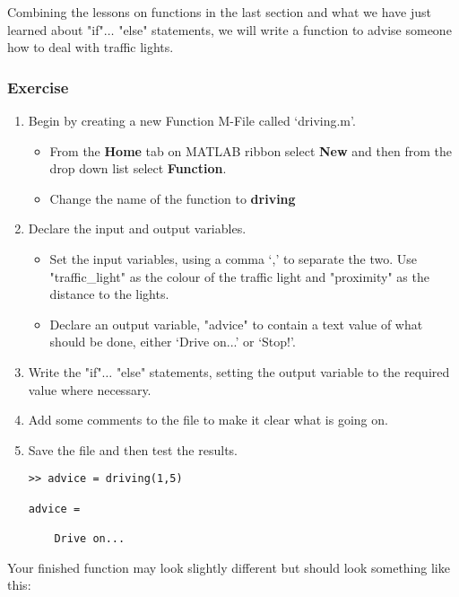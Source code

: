 \documentclass[12pt,a4paper]{article}
\begin{document}
Combining the lessons on functions in the last section and what we have just learned about "if"$\dots$ "else" statements, we will write a function to advise someone how to deal with traffic lights.

\subsubsection*{Exercise}
\begin{enumerate}
	\item Begin by creating a new Function M-File called `driving.m'.
	\begin{itemize}
		\item From the \textbf{Home} tab on MATLAB ribbon select \textbf{New} and then from the drop down list select \textbf{Function}.
		\item Change the name of the function to \textbf{driving}		
	\end{itemize}
	\item Declare the input and output variables.
	\begin{itemize}
		\item Set the input variables, using a comma `,' to separate the two.  Use "traffic_light" as the colour of the traffic light and "proximity" as the distance to the lights.
		\item Declare an output variable, "advice" to contain a text value of what should be done, either `Drive on...' or `Stop!'.			
	\end{itemize}
	\item Write the "if"$\dots$ "else" statements, setting the output variable to the required value where necessary.
	\item Add some comments to the file to make it clear what is going on.
	\item Save the file and then test the results.	
	\begin{lstlisting}[style=Matlab-editor]
>> advice = driving(1,5)

advice =

    Drive on...
	\end{lstlisting}

\end{enumerate}

Your finished function may look slightly different but should look something like this:
\end{document}
